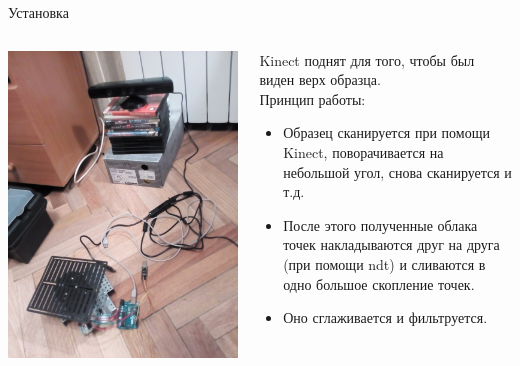 \documentclass{beamer}
\begin{document}
\begin{frame}{Установка}
    \begin{columns}[T]
        \begin{column}[T]{5cm}
            \includegraphics[scale=0.06]{devices}
        \end{column}
        \begin{column}[T]{5cm}
            \small
            Kinect поднят для того, чтобы  был виден верх образца. \\
            Принцип работы:
            \begin{itemize}
            \item
            Образец сканируется при помощи Kinect, поворачивается на небольшой угол, снова сканируется и т.д.
            \item
            После этого полученные облака точек накладываются друг на друга (при помощи ndt) и сливаются в одно большое скопление точек.
            \item
            Оно сглаживается и фильтруется.
            \end{itemize}




        \end{column}
    \end{columns}
\end{frame}
\end{document}
